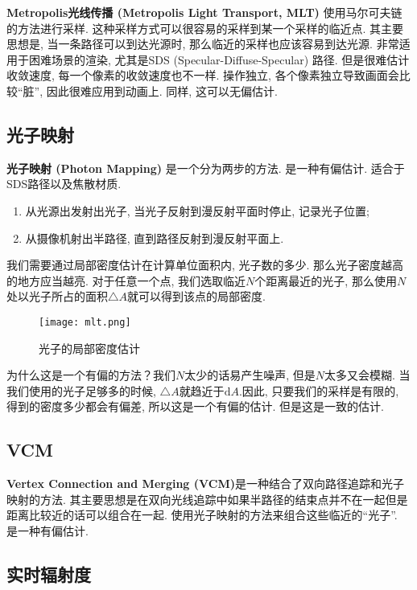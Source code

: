\textbf{Metropolis光线传播 (Metropolis Light Transport, MLT) }使用马尔可夫链的方法进行采样. 这种采样方式可以很容易的采样到某一个采样的临近点. 其主要思想是, 当一条路径可以到达光源时, 那么临近的采样也应该容易到达光源. 非常适用于困难场景的渲染, 尤其是SDS (Specular-Diffuse-Specular) 路径. 但是很难估计收敛速度, 每一个像素的收敛速度也不一样. 操作独立, 各个像素独立导致画面会比较``脏”, 因此很难应用到动画上. 同样, 这可以无偏估计. 

\subsection{光子映射}

\textbf{光子映射 (Photon Mapping) }是一个分为两步的方法. 是一种有偏估计. 适合于SDS路径以及焦散材质. 
\begin{enumerate}
	\item 从光源出发射出光子, 当光子反射到漫反射平面时停止, 记录光子位置; 
	\item 从摄像机射出半路径, 直到路径反射到漫反射平面上. 
\end{enumerate}

我们需要通过局部密度估计在计算单位面积内, 光子数的多少. 那么光子密度越高的地方应当越亮. 对于任意一个点, 我们选取临近$N$个距离最近的光子, 那么使用$N$处以光子所占的面积$\triangle A$就可以得到该点的局部密度. 

\begin{figure}[H]
	\centering
	\texttt{[image: mlt.png]}
	\caption{光子的局部密度估计}
	\label{fig:mlt}
\end{figure}

为什么这是一个有偏的方法？我们$N$太少的话易产生噪声, 但是$N$太多又会模糊. 当我们使用的光子足够多的时候, $\triangle A$就趋近于$\text{d}A$.因此, 只要我们的采样是有限的, 得到的密度多少都会有偏差, 所以这是一个有偏的估计. 但是这是一致的估计. 

\subsection{VCM}

\textbf{Vertex Connection and Merging (VCM)}是一种结合了双向路径追踪和光子映射的方法. 其主要思想是在双向光线追踪中如果半路径的结束点并不在一起但是距离比较近的话可以组合在一起. 使用光子映射的方法来组合这些临近的``光子”. 是一种有偏估计. 

\subsection{实时辐射度}

